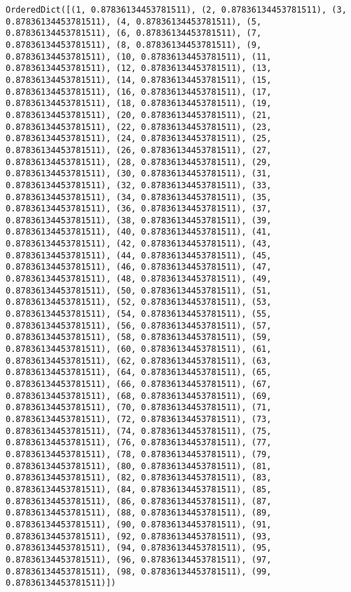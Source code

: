 \documentclass[11pt]{article}
\begin{document}
\begin{Verbatim}[commandchars=\\\{\}]
OrderedDict([(1, 0.87836134453781511), (2, 0.87836134453781511), (3, 0.87836134453781511), (4, 0.87836134453781511), (5, 0.87836134453781511), (6, 0.87836134453781511), (7, 0.87836134453781511), (8, 0.87836134453781511), (9, 0.87836134453781511), (10, 0.87836134453781511), (11, 0.87836134453781511), (12, 0.87836134453781511), (13, 0.87836134453781511), (14, 0.87836134453781511), (15, 0.87836134453781511), (16, 0.87836134453781511), (17, 0.87836134453781511), (18, 0.87836134453781511), (19, 0.87836134453781511), (20, 0.87836134453781511), (21, 0.87836134453781511), (22, 0.87836134453781511), (23, 0.87836134453781511), (24, 0.87836134453781511), (25, 0.87836134453781511), (26, 0.87836134453781511), (27, 0.87836134453781511), (28, 0.87836134453781511), (29, 0.87836134453781511), (30, 0.87836134453781511), (31, 0.87836134453781511), (32, 0.87836134453781511), (33, 0.87836134453781511), (34, 0.87836134453781511), (35, 0.87836134453781511), (36, 0.87836134453781511), (37, 0.87836134453781511), (38, 0.87836134453781511), (39, 0.87836134453781511), (40, 0.87836134453781511), (41, 0.87836134453781511), (42, 0.87836134453781511), (43, 0.87836134453781511), (44, 0.87836134453781511), (45, 0.87836134453781511), (46, 0.87836134453781511), (47, 0.87836134453781511), (48, 0.87836134453781511), (49, 0.87836134453781511), (50, 0.87836134453781511), (51, 0.87836134453781511), (52, 0.87836134453781511), (53, 0.87836134453781511), (54, 0.87836134453781511), (55, 0.87836134453781511), (56, 0.87836134453781511), (57, 0.87836134453781511), (58, 0.87836134453781511), (59, 0.87836134453781511), (60, 0.87836134453781511), (61, 0.87836134453781511), (62, 0.87836134453781511), (63, 0.87836134453781511), (64, 0.87836134453781511), (65, 0.87836134453781511), (66, 0.87836134453781511), (67, 0.87836134453781511), (68, 0.87836134453781511), (69, 0.87836134453781511), (70, 0.87836134453781511), (71, 0.87836134453781511), (72, 0.87836134453781511), (73, 0.87836134453781511), (74, 0.87836134453781511), (75, 0.87836134453781511), (76, 0.87836134453781511), (77, 0.87836134453781511), (78, 0.87836134453781511), (79, 0.87836134453781511), (80, 0.87836134453781511), (81, 0.87836134453781511), (82, 0.87836134453781511), (83, 0.87836134453781511), (84, 0.87836134453781511), (85, 0.87836134453781511), (86, 0.87836134453781511), (87, 0.87836134453781511), (88, 0.87836134453781511), (89, 0.87836134453781511), (90, 0.87836134453781511), (91, 0.87836134453781511), (92, 0.87836134453781511), (93, 0.87836134453781511), (94, 0.87836134453781511), (95, 0.87836134453781511), (96, 0.87836134453781511), (97, 0.87836134453781511), (98, 0.87836134453781511), (99, 0.87836134453781511)])

\end{Verbatim}
\end{document}
